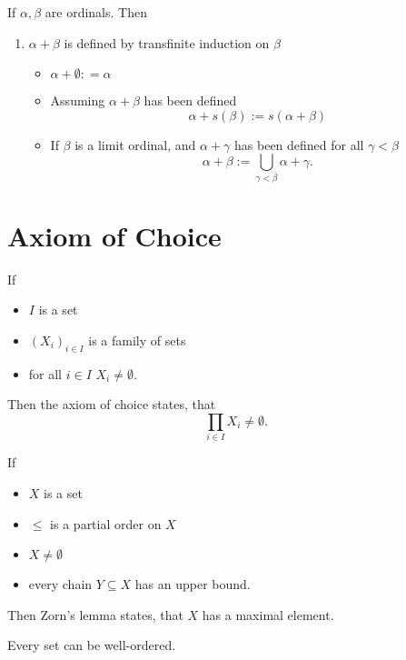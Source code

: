 \begin{definition}
    If $\alpha, \beta$ are ordinals.
    Then 
    \begin{enumerate}[label=\arabic*)]
        \item $\alpha + \beta$ is defined by transfinite induction on $\beta$
        \begin{itemize}
            \item $\alpha + \emptyset : = \alpha$
            \item Assuming $\alpha + \beta$ has been defined
            $$\alpha + s(\beta) := s(\alpha + \beta)$$
            \item If $\beta$ is a limit ordinal, and $\alpha + \gamma$ has been defined for all $\gamma < \beta$
            $$ \alpha + \beta := \bigcup_{\gamma < \beta} \alpha + \gamma. $$
        \end{itemize}
    \end{enumerate}
\end{definition}

\section{Axiom of Choice}
\begin{recall}
    If 
    \begin{itemize}
        \item $I$ is a set
        \item $(X_i)_{i\in I}$ is a family of sets
        \item for all $i \in I$ $X_i \ne \emptyset$.
    \end{itemize}
    Then the axiom of choice states, that
    $$ \prod_{i \in I} X_i \ne \emptyset.$$
\end{recall}

\begin{recall}
    If 
    \begin{itemize}
        \item $X$ is a set
        \item $\leq$ is a partial order on $X$
        \item $X \ne \emptyset$
        \item every chain $Y \subseteq X$ has an upper bound.
    \end{itemize}
    Then Zorn's lemma states, that $X$ has a maximal element.
\end{recall}

\begin{recall}
    Every set can be well-ordered.
\end{recall}

